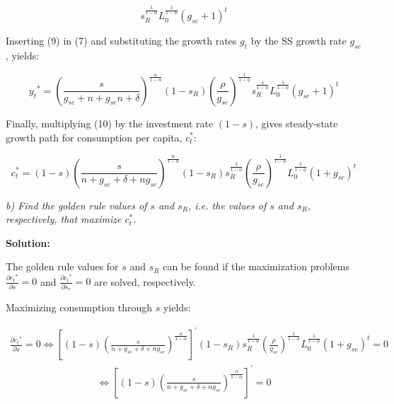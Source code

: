 \documentclass[11pt]{article} %
\begin{document}
\begin{equation}
    s_R^{\frac{\lambda}{1-\phi}}L_0^{\frac{\lambda}{1-\phi}}(g_{se}+1)^t
\end{equation}

\bigskip\par Inserting (9) in (7) and substituting the growth rates $g_t$ by the SS growth rate $g_{se}$, yields:

\begin{equation}
    {y_t}^* = \left(\frac{s}{g_{se}+n+g_{se}n+\delta}\right)^{\frac{\alpha}{1-\alpha}}(1-s_R) \left(\frac{\rho}{g_{se}}\right)^{\frac{1}{1-\phi}}s_R^{\frac{\lambda}{1-\phi}}L_0^{\frac{\lambda}{1-\phi}}(g_{se}+1)^t
\end{equation}

\bigskip\par Finally, multiplying (10) by the investment rate $(1-s)$, gives steady-state growth path for consumption per capita, $c_t^*$:

\begin{equation}
    c_t^* = (1-s)\left(\frac{s}{n+g_{se}+\delta+ng_{se}}\right)^{\frac{\alpha}{1-\alpha}}(1-s_{R})s_R^{\frac{\lambda}{1-\phi}}\left(\frac{\rho}{g_{se}} \right)^{\frac{1}{1-\phi}}L_0^{\frac{\lambda}{1-\phi}}(1+g_{se})^t
\end{equation}










\pagebreak
\textit{b) Find the golden rule values of $s$ and $s_R$, i.e. the values of $s$ and $s_R$, respectively, that maximize $c_t^*$.}

\bigskip\bigskip\bigskip\par \textbf{Solution:}
\par The golden rule values for $s$ and $s_R$ can be found if the maximization problems $\frac{\partial{c_t}^*}{\partial{s}}=0$ and $\frac{\partial{c_t}^*}{\partial{s_r}}=0$ are solved, respectively.

\par Maximizing consumption through $s$ yields:

\begin{align*}
    \frac{\partial{c_t}^*}{\partial{s}} = 0
    \Longleftrightarrow \left[(1-s)\left(\frac{s}{n+g_{se}+\delta+ng_{se}}\right)^{\frac{\alpha}{1-\alpha}}\right]^{'}(1-s_{R})s_R^{\frac{\lambda}{1-\phi}}\left(\frac{\rho}{g_{se}} \right)^{\frac{1}{1-\phi}}L_0^{\frac{\lambda}{1-\phi}}(1+g_{se})^t=0
\end{align*}
\begin{align*}
    \Longleftrightarrow \left[(1-s)\left(\frac{s}{n+g_{se}+\delta+ng_{se}}\right)^{\frac{\alpha}{1-\alpha}}\right]^{'}=0 
\end{align*}
\end{document}

